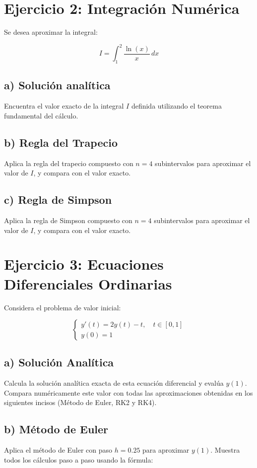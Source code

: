 \documentclass[12pt,a4paper]{article}
\begin{document}
\section*{Ejercicio 2: Integración Numérica}

Se desea aproximar la integral:

$$I = \int_{1}^{2} \frac{\ln(x)}{x} \, dx$$

\subsection*{a) Solución analítica}
Encuentra el valor exacto de la integral $I$ definida utilizando el teorema fundamental del cálculo.

\subsection*{b) Regla del Trapecio}
Aplica la regla del trapecio compuesto con $n = 4$ subintervalos para aproximar el valor de $I$, y compara con el valor exacto.

\subsection*{c) Regla de Simpson}
Aplica la regla de Simpson compuesto con $n = 4$ subintervalos para aproximar el valor de $I$, y compara con el valor exacto.

\section*{Ejercicio 3: Ecuaciones Diferenciales Ordinarias}

Considera el problema de valor inicial:

$$\begin{cases}
y'(t) = 2y(t) - t, \quad t \in [0, 1] \\
y(0) = 1
\end{cases}$$

\subsection*{a) Solución Analítica}
Calcula la solución analítica exacta de esta ecuación diferencial y evalúa $y(1)$. Compara numéricamente este valor con todas las aproximaciones obtenidas en los siguientes incisos (Método de Euler, RK2 y RK4).

\subsection*{b) Método de Euler}
Aplica el método de Euler con paso $h = 0.25$ para aproximar $y(1)$. Muestra todos los cálculos paso a paso usando la fórmula:
\end{document}
